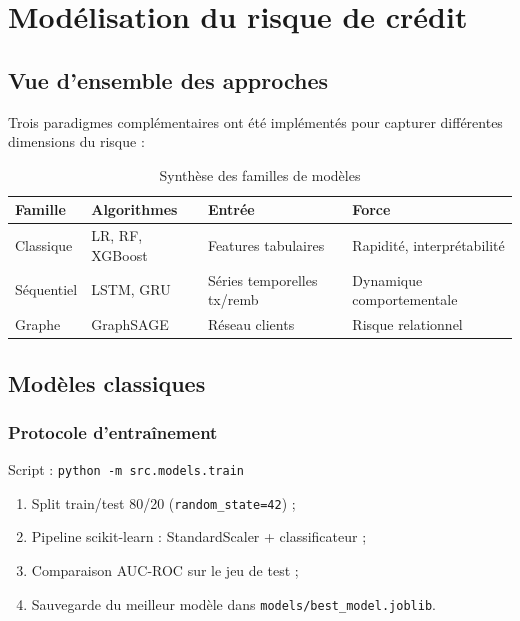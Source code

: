 \chapter{Modélisation du risque de crédit}
\label{ch:modelisation}

\section{Vue d'ensemble des approches}

Trois paradigmes complémentaires ont été implémentés pour capturer différentes dimensions du risque :

\begin{table}[H]
  \centering
  \caption{Synthèse des familles de modèles}
  \begin{tabular}{|l|l|l|p{4cm}|}
    \hline
    \textbf{Famille} & \textbf{Algorithmes} & \textbf{Entrée} & \textbf{Force} \\
    \hline
    Classique & LR, RF, XGBoost & Features tabulaires & Rapidité, interprétabilité \\
    \hline
    Séquentiel & LSTM, GRU & Séries temporelles tx/remb & Dynamique comportementale \\
    \hline
    Graphe & GraphSAGE & Réseau clients & Risque relationnel \\
    \hline
  \end{tabular}
\end{table}

\section{Modèles classiques}

\subsection{Protocole d'entraînement}

Script : \texttt{python -m src.models.train}

\begin{enumerate}[leftmargin=*]
  \item Split train/test 80/20 (\texttt{random\_state=42}) ;
  \item Pipeline scikit-learn : StandardScaler + classificateur ;
  \item Comparaison AUC-ROC sur le jeu de test ;
  \item Sauvegarde du meilleur modèle dans \texttt{models/best\_model.joblib}.
\end{enumerate}

